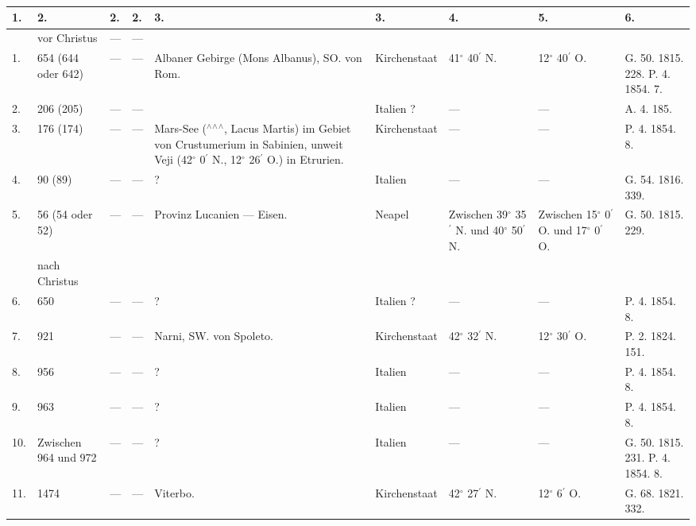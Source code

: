 \documentclass[a4paper, 8pt, oneside, polutonikogreek, german]{article}
\begin{document}
\subsubsection{}
\begin{center}
    \footnotesize
    \begin{longtable}{|p{3mm}|p{10mm}|p{5mm}|p{13mm}|p{25mm}|p{15mm}|p{10mm}|p{10mm}|p{11mm}|}
    \hline
        1. & 2. & 2. & 2. & 3. & 3. & 4. & 5. & 6. \\ \hline
          & vor Christus & --- & --- &   &   &   &   &   \\ \hline
        1. & 654 (644 oder 642) & --- & --- & Albaner Gebirge (Mons Albanus), SO. von Rom. & Kirchenstaat & 41$^\circ$ 40$^\prime$ N. & 12$^\circ$ 40$^\prime$ O. & G. 50. 1815. 228. P. 4. 1854. 7. \\ \hline
        2. & 206 (205) & --- & --- & ~ & Italien ? & --- & --- & A. 4. 185. \\ \hline
        3. & 176 (174) & --- & --- & Mars-See ($^\wedge$$^\wedge$$^\wedge$, Lacus Martis) im Gebiet von Crustumerium in Sabinien, unweit Veji (42$^\circ$ 0$^\prime$ N., 12$^\circ$ 26$^\prime$ O.) in Etrurien. & Kirchenstaat & --- & --- & P. 4. 1854. 8. \\ \hline
        4. & 90 (89) & --- & --- & ? & Italien & --- & --- & G. 54. 1816. 339. \\ \hline
        5. & 56 (54 oder 52) & --- & --- & Provinz Lucanien --- Eisen. & Neapel & Zwischen 39$^\circ$ 35$^\prime$ N. und 40$^\circ$ 50$^\prime$ N. & Zwischen 15$^\circ$ 0$^\prime$ O. und 17$^\circ$ 0$^\prime$ O. & G. 50. 1815. 229. \\ \hline
          & nach Christus &   &   &   &   &   &   &   \\ \hline
        6. & 650 & --- & --- & ? & Italien ? & --- & --- & P. 4. 1854. 8. \\ \hline
        7. & 921 & --- & --- & Narni, SW. von Spoleto. & Kirchenstaat & 42$^\circ$ 32$^\prime$ N. & 12$^\circ$ 30$^\prime$ O. & P. 2. 1824. 151. \\ \hline
        8. & 956 & --- & --- & ? & Italien & --- & --- & P. 4. 1854. 8. \\ \hline
        9. & 963 & --- & --- & ? & Italien & --- & --- & P. 4. 1854. 8. \\ \hline
        10. & Zwischen 964 und 972 & --- & --- & ? & Italien & --- & --- & G. 50. 1815. 231. P. 4. 1854. 8. \\ \hline
        11. & 1474 & --- & --- & Viterbo. & Kirchenstaat & 42$^\circ$ 27$^\prime$ N. & 12$^\circ$ 6$^\prime$ O. & G. 68. 1821. 332. \\ \hline

\end{longtable}
\end{center}
\end{document}
